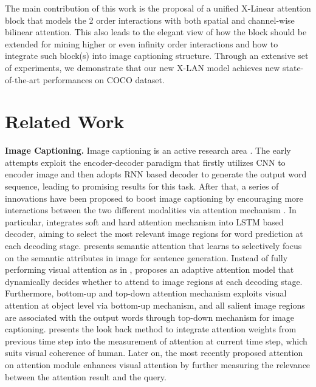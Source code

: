 \documentclass[10pt,twocolumn,letterpaper]{article}
\begin{document}
The main contribution of this work is the proposal of a unified X-Linear attention block that models the 2 order interactions with both spatial and channel-wise bilinear attention. This also leads to the elegant view of how the block should be extended for mining higher or even infinity order interactions and how to integrate such block(s) into image captioning structure. Through an extensive set of experiments, we demonstrate that our new X-LAN model achieves new state-of-the-art performances on COCO dataset.



\section{Related Work}\label{sec:RW}

\textbf{Image Captioning.} Image captioning is an active research area \cite{anderson2017bottom,huang2019attentio,li2019novel,Xiong2016MetaMind,Mao:NIPS14,rennie2017self,Vinyals14,wang2019paragraph,Xu:ICML15,yao2017novel,yao2019hierarchy,yao2017boosting,You:CVPR16}. The early attempts \cite{Mao:NIPS14,Vinyals14} exploit the encoder-decoder paradigm that firstly utilizes CNN to encoder image and then adopts RNN based decoder to generate the output word sequence, leading to promising results for this task. After that, a series of innovations have been proposed to boost image captioning by encouraging more interactions between the two different modalities via attention mechanism \cite{cho2015describing}. In particular, \cite{Xu:ICML15} integrates soft and hard attention mechanism into LSTM based decoder, aiming to select the most relevant image regions for word prediction at each decoding stage. \cite{You:CVPR16} presents semantic attention that learns to selectively focus on the semantic attributes in image for sentence generation. Instead of fully performing visual attention as in \cite{Xu:ICML15}, \cite{Xiong2016MetaMind} proposes an adaptive attention model that dynamically decides whether to attend to image regions at each decoding stage. Furthermore, bottom-up and top-down attention mechanism \cite{anderson2017bottom} exploits visual attention at object level via bottom-up mechanism, and all salient image regions are associated with the output words through top-down mechanism for image captioning. \cite{qin2019look} presents the look back method to integrate attention weights from previous time step into the measurement of attention at current time step, which suits visual coherence of human. Later on, the most recently proposed attention on attention module \cite{huang2019attentio} enhances visual attention by further measuring the relevance between the attention result and the query.
\end{document}
